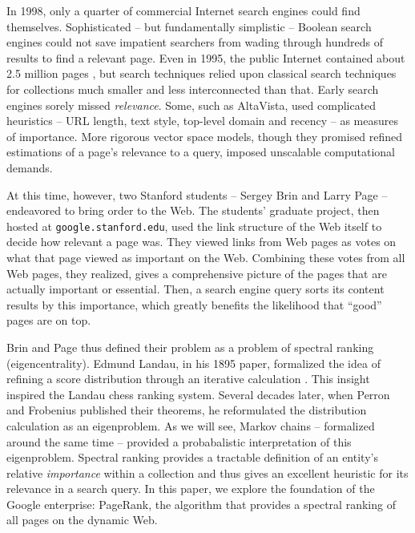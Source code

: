 \documentclass[../exploring-pagerank.tex]{subfiles}
\begin{document}
In 1998, only a quarter of commercial Internet search engines could find themselves. Sophisticated -- but fundamentally simplistic -- Boolean search engines could not save impatient searchers from wading through hundreds of results to find a relevant page. Even in 1995, the public Internet contained about 2.5 million pages \cite{TotalNumberWebsites}, but search techniques relied upon classical search techniques for collections much smaller and less interconnected than that. Early search engines sorely missed \textit{relevance}. Some, such as AltaVista, used complicated heuristics -- URL length, text style, top-level domain and recency -- as measures of importance. More rigorous vector space models, though they promised refined estimations of a page's relevance to a query, imposed unscalable computational demands.

At this time, however, two Stanford students -- Sergey Brin and Larry Page -- endeavored to bring order to the Web. The students’ graduate project, then hosted at \texttt{google.stanford.edu}, used the link structure of the Web itself to decide how relevant a page was. They viewed links from Web pages as votes on what that page viewed as important on the Web. Combining these votes from all Web pages, they realized, gives a comprehensive picture of the pages that are actually important or essential. Then, a search engine query sorts its content results by this importance, which greatly benefits the likelihood that ``good'' pages are on top.

Brin and Page thus defined their problem as a problem of spectral ranking (eigencentrality). Edmund Landau, in his 1895 paper, formalized the idea of refining a score distribution through an iterative calculation \cite{vignaSpectralRanking2009}. This insight inspired the Landau chess ranking system. Several decades later, when Perron and Frobenius published their theorems, he reformulated the distribution calculation as an eigenproblem. As we will see, Markov chains -- formalized around the same time -- provided a probabalistic interpretation of this eigenproblem. Spectral ranking provides a tractable definition of an entity's relative \textit{importance} within a collection and thus gives an excellent heuristic for its relevance in a search query. In this paper, we explore the foundation of the Google enterprise: PageRank, the algorithm that provides a spectral ranking of all pages on the dynamic Web.
\end{document}
